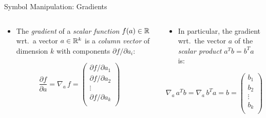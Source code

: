 \documentclass[mathserif, aspectratio=169]{beamer}
\begin{document}
\begin{frame}{Symbol Manipulation: Gradients}
	\begin{columns}[t]
		\begin{column}{0.5\textwidth}
			\begin{itemize}
				\item The \emph{gradient} of a \emph{scalar function} $f(a) \in \mathbb{R}$ wrt.\ a vector $a \in \mathbb{R}^k$ is
					a \emph{column vector} of dimension $k$ with components ${\partial f}/{\partial a_i}$: 
			\end{itemize}
			\vspace{-5mm}
			\begin{center}
				\[ 
					\frac{\partial f}{\partial a} = \nabla_a\, f =
					\begin{pmatrix}
						{\partial f}/{\partial a_1} \\ 
						{\partial f}/{\partial a_2} \\
						\vdots \\
						{\partial f}/{\partial a_k} \\ 
					\end{pmatrix}
				\]
			\end{center}
		\end{column}
		\begin{column}{0.5\textwidth}
			\begin{itemize}
				\item In particular, the gradient wrt.\ the vector $a$ of the \emph{scalar product} $a^T b = b^T a$ is:
			\end{itemize}
			\begin{center}
				\[ 
					\nabla_a\, a^T b = \nabla_a\, b^T a = b =
					\begin{pmatrix}
						b_1 \\ b_2 \\ \vdots \\ b_k \\
					\end{pmatrix}
				\]
			\end{center}
		\end{column}
	\end{columns}
\end{frame}
\end{document}
